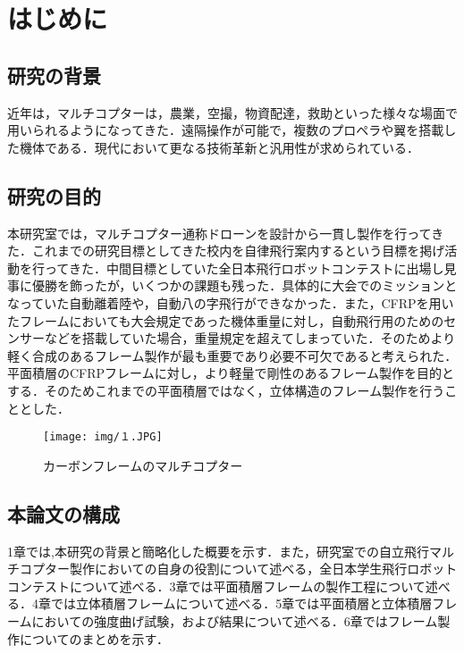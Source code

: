 \chapter{はじめに}


\section{研究の背景}
近年は，マルチコプターは，農業，空撮，物資配達，救助といった様々な場面で用いられるようになってきた．遠隔操作が可能で，複数のプロペラや翼を搭載した機体である．現代において更なる技術革新と汎用性が求められている．


\section{研究の目的}
本研究室では，マルチコプター通称ドローンを設計から一貫し製作を行ってきた．これまでの研究目標としてきた校内を自律飛行案内するという目標を掲げ活動を行ってきた．中間目標としていた全日本飛行ロボットコンテストに出場し見事に優勝を飾ったが，いくつかの課題も残った．具体的に大会でのミッションとなっていた自動離着陸や，自動八の字飛行ができなかった．また，CFRPを用いたフレームにおいても大会規定であった機体重量に対し，自動飛行用のためのセンサーなどを搭載していた場合，重量規定を超えてしまっていた．そのためより軽く合成のあるフレーム製作が最も重要であり必要不可欠であると考えられた．平面積層のCFRPフレームに対し，より軽量で剛性のあるフレーム製作を目的とする．そのためこれまでの平面積層ではなく，立体構造のフレーム製作を行うこととした．


\begin{figure}[htbp]
  \begin{center}
    \texttt{[image: img/１.JPG]}
    \end{center}
  \caption{カーボンフレームのマルチコプター}
 \label{fig:robot}
\end{figure}


\section{本論文の構成}
1章では,本研究の背景と簡略化した概要を示す．また，研究室での自立飛行マルチコプター製作においての自身の役割について述べる，全日本学生飛行ロボットコンテストについて述べる．3章では平面積層フレームの製作工程について述べる．4章では立体積層フレームについて述べる．5章では平面積層と立体積層フレームにおいての強度曲げ試験，および結果について述べる．6章ではフレーム製作についてのまとめを示す．